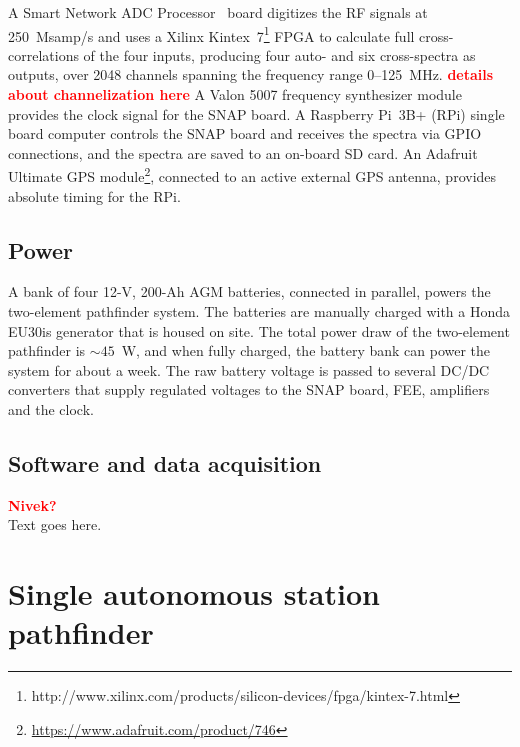 \documentclass{ws-jai}
\newcommand{\attention}[1]{\textcolor{red}{\bf {#1}}}
\begin{document}
A Smart Network ADC Processor~\citep[SNAP;][]{2016JAI.....541001H}
board digitizes the RF signals at 250~Msamp/s and uses a Xilinx
Kintex~7\footnote{http://www.xilinx.com/products/silicon-devices/fpga/kintex-7.html}
FPGA to calculate full cross-correlations of the four inputs,
producing four auto- and six cross-spectra as outputs, over 2048
channels spanning the frequency range 0--125~MHz.  \attention{details
  about channelization here} A Valon 5007 frequency synthesizer module
provides the clock signal for the SNAP board.  A Raspberry Pi~3B+
(RPi) single board computer controls the SNAP board and receives the
spectra via GPIO connections, and the spectra are saved to an on-board
SD card.  An Adafruit Ultimate GPS
module\footnote{\url{https://www.adafruit.com/product/746}}, connected
to an active external GPS antenna, provides absolute timing for the
RPi.

\subsection{Power}

A bank of four 12-V, 200-Ah AGM batteries, connected in parallel,
powers the two-element pathfinder system.  The batteries are manually
charged with a Honda EU30is generator that is housed on site.  The
total power draw of the two-element pathfinder is $\sim45$~W, and when
fully charged, the battery bank can power the system for about a week.
The raw battery voltage is passed to several DC/DC converters that
supply regulated voltages to the SNAP board, FEE, amplifiers and the
clock.

\subsection{Software and data acquisition}
\attention{Nivek?} \\
Text goes here.

\section{Single autonomous station pathfinder}
\end{document}
